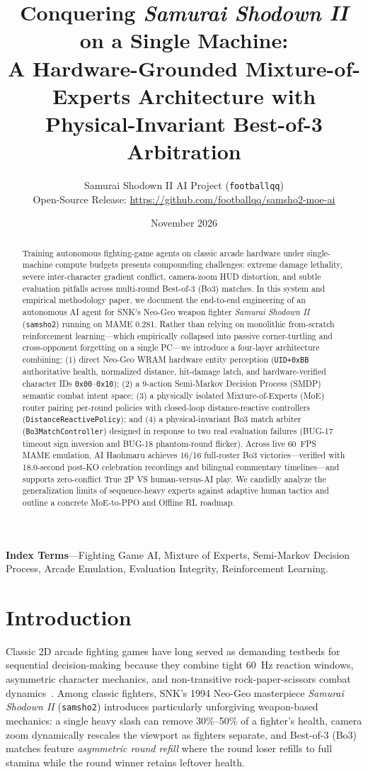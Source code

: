 \documentclass[10pt,twocolumn]{article}
\title{\Large\bfseries Conquering \textit{Samurai Shodown II} on a Single Machine:\\
A Hardware-Grounded Mixture-of-Experts Architecture with Physical-Invariant Best-of-3 Arbitration}
\author{Samurai Shodown II AI Project (\texttt{footballqq})\\
\small Open-Source Release: \url{https://github.com/footballqq/samsho2-moe-ai}}
\date{November 2026}
\begin{document}
\maketitle

\begin{abstract}
Training autonomous fighting-game agents on classic arcade hardware under single-machine compute budgets presents compounding challenges: extreme damage lethality, severe inter-character gradient conflict, camera-zoom HUD distortion, and subtle evaluation pitfalls across multi-round Best-of-3 (Bo3) matches. In this system and empirical methodology paper, we document the end-to-end engineering of an autonomous AI agent for SNK's Neo-Geo weapon fighter \textit{Samurai Shodown II} (\texttt{samsho2}) running on MAME 0.281. Rather than relying on monolithic from-scratch reinforcement learning—which empirically collapsed into passive corner-turtling and cross-opponent forgetting on a single PC—we introduce a four-layer architecture combining: (1) direct Neo-Geo WRAM hardware entity perception (\texttt{UID+0xBB} authoritative health, normalized distance, hit-damage latch, and hardware-verified character IDs \texttt{0x00}--\texttt{0x10}); (2) a 9-action Semi-Markov Decision Process (SMDP) semantic combat intent space; (3) a physically isolated Mixture-of-Experts (MoE) router pairing per-round policies with closed-loop distance-reactive controllers (\texttt{DistanceReactivePolicy}); and (4) a physical-invariant Bo3 match arbiter (\texttt{Bo3MatchController}) designed in response to two real evaluation failures (BUG-17 timeout sign inversion and BUG-18 phantom-round flicker). Across live 60~FPS MAME emulation, AI Haohmaru achieves 16/16 full-roster Bo3 victories—verified with 18.0-second post-KO celebration recordings and bilingual commentary timelines—and supports zero-conflict True 2P VS human-versus-AI play. We candidly analyze the generalization limits of sequence-heavy experts against adaptive human tactics and outline a concrete MoE-to-PPO and Offline RL roadmap.
\end{abstract}

\noindent\textbf{Index Terms}---Fighting Game AI, Mixture of Experts, Semi-Markov Decision Process, Arcade Emulation, Evaluation Integrity, Reinforcement Learning.

\section{Introduction}
Classic 2D arcade fighting games have long served as demanding testbeds for sequential decision-making because they combine tight 60~Hz reaction windows, asymmetric character mechanics, and non-transitive rock-paper-scissors combat dynamics~\cite{lu2013fightingice,vinyals2019alphastar}. Among classic fighters, SNK's 1994 Neo-Geo masterpiece \textit{Samurai Shodown II} (\texttt{samsho2}) introduces particularly unforgiving weapon-based mechanics: a single heavy slash can remove 30\%--50\% of a fighter's health, camera zoom dynamically rescales the viewport as fighters separate, and Best-of-3 (Bo3) matches feature \emph{asymmetric round refill} where the round loser refills to full stamina while the round winner retains leftover health.
\end{document}
